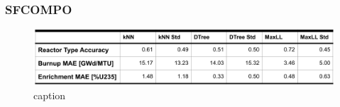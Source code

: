 \begin{frame}
  \frametitle{SFCOMPO}
  \begin{figure}
    \centering
    \includegraphics[width=\textwidth]{./figures/sfcompo_pred_results.png}
    \caption{caption}
  \end{figure}
\end{frame}
